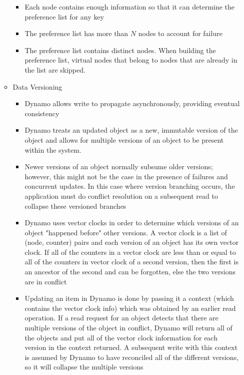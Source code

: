 \documentclass[a4paper]{article}
\begin{document}
\begin{itemize}
\begin{itemize}
\begin{itemize}
\item Each node contains enough information so that it can determine the preference list for any key

\item The preference list has more than $N$ nodes to account for failure

\item The preference list contains distinct nodes. When building the preference list, virtual nodes that belong to nodes that are already in the list are skipped. 
\end{itemize}

\item Data Versioning
\begin{itemize}
\item Dynamo allows write to propagate asynchronously, providing eventual consistency

\item Dynamo treats an updated object as a new, immutable version of the object and allows for multiple versions of an object to be present within the system.

\item Newer versions of an object normally subsume older versions; however, this might not be the case in the presence  of failures and concurrent updates. In this case where version branching occurs, the application must do conflict resolution on a subsequent read to collapse these versioned branches

\item Dynamo uses vector clocks in order to determine which versions of an object "happened before" other versions. A vector clock is a list of (node, counter) pairs and each version of an object has its own vector clock. If all of the counters in a vector clock are less than or equal to all of the counters in vector clock of a second version, then the first is an ancestor of the second and can be forgotten, else the two versions are in conflict

\item Updating an item in Dynamo is done by passing it a context (which contains the vector clock info) which was obtained by an earlier read operation. If a read request for an object detects that there are multiple versions of the object in conflict, Dynamo will return all of the objects and put all of the vector clock information for each version in the context returned. A subsequent write with this context is assumed by Dynamo to have reconciled all of the different versions, so it will collapse the multiple versions


\end{itemize}
\end{itemize}
\end{itemize}
\end{document}
